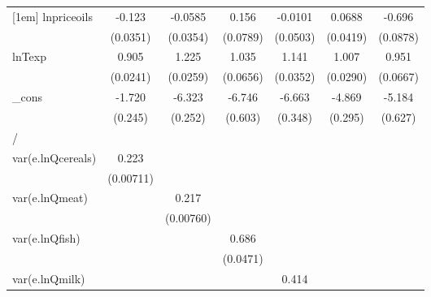 {\begin{tabular}{l*{6}{c}}
[1em]
lnpriceoils &      -0.123\sym{***}&     -0.0585         &       0.156\sym{*}  &     -0.0101         &      0.0688         &      -0.696\sym{***}\\
            &    (0.0351)         &    (0.0354)         &    (0.0789)         &    (0.0503)         &    (0.0419)         &    (0.0878)         \\
[1em]
lnTexp      &       0.905\sym{***}&       1.225\sym{***}&       1.035\sym{***}&       1.141\sym{***}&       1.007\sym{***}&       0.951\sym{***}\\
            &    (0.0241)         &    (0.0259)         &    (0.0656)         &    (0.0352)         &    (0.0290)         &    (0.0667)         \\
[1em]
\_cons      &      -1.720\sym{***}&      -6.323\sym{***}&      -6.746\sym{***}&      -6.663\sym{***}&      -4.869\sym{***}&      -5.184\sym{***}\\
            &     (0.245)         &     (0.252)         &     (0.603)         &     (0.348)         &     (0.295)         &     (0.627)         \\
\hline
/           &                     &                     &                     &                     &                     &                     \\
var(e.lnQcereals)&       0.223\sym{***}&                     &                     &                     &                     &                     \\
            &   (0.00711)         &                     &                     &                     &                     &                     \\
[1em]
var(e.lnQmeat)&                     &       0.217\sym{***}&                     &                     &                     &                     \\
            &                     &   (0.00760)         &                     &                     &                     &                     \\
[1em]
var(e.lnQfish)&                     &                     &       0.686\sym{***}&                     &                     &                     \\
            &                     &                     &    (0.0471)         &                     &                     &                     \\
[1em]
var(e.lnQmilk)&                     &                     &                     &       0.414\sym{***}&                     &                     \\

\end{tabular}}
